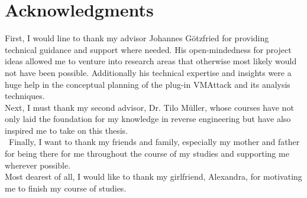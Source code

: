 \documentclass[10pt,twoside,a4paper,bibliography=totoc]{scrbook}
\begin{document}
\section{Acknowledgments}
First, I would line to thank my advisor Johannes Götzfried for providing technical guidance and support where needed. His open-mindedness for project ideas allowed me to venture into research areas that otherwise most likely would not have been possible. Additionally his technical expertise and insights were a huge help in the conceptual planning of the plug-in VMAttack and its analysis techniques. \\
Next, I must thank my second advisor, Dr. Tilo Müller, whose courses have not only laid the foundation for my knowledge in reverse engineering but have also inspired me to take on this thesis. \\\
Finally, I want to thank my friends and family, especially my mother and father for being there for me throughout the course of my studies and supporting me wherever possible. \\
Most dearest of all, I would like to thank my girlfriend, Alexandra, for motivating me to finish my course of studies.

\fancyhead[RE]{\rightmark}

%
% 
\end{document}
